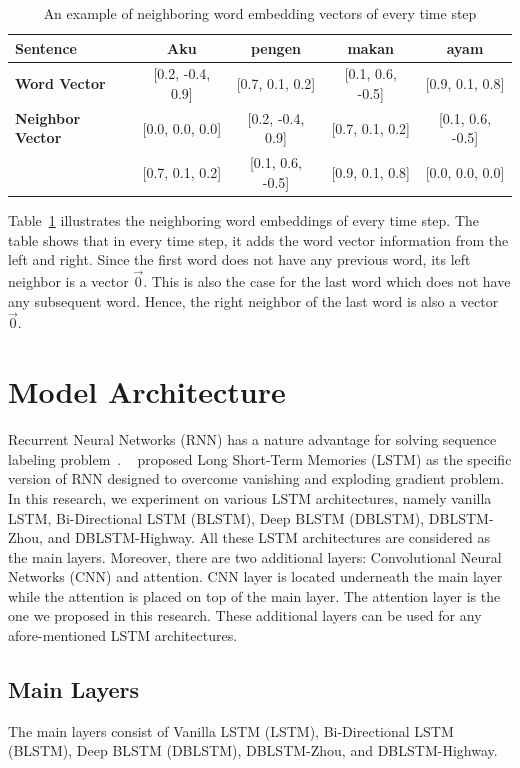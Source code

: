 \begin{table}
	\centering
	\caption{An example of neighboring word embedding vectors of every time step}
	\label{tab:examplenwe}
	\begin{tabular}{|lcccc|}
		\hline
		\textbf{Sentence} 				& Aku & pengen & makan & ayam \\
		\hline
		\textbf{Word Vector}		& [0.2, -0.4, 0.9] & [0.7, 0.1, 0.2] & [0.1, 0.6, -0.5] & [0.9, 0.1, 0.8] \\			\textbf{Neighbor Vector}	& [0.0, 0.0, 0.0] & [0.2, -0.4, 0.9] & [0.7, 0.1, 0.2] & [0.1, 0.6, -0.5] \\
													& [0.7, 0.1, 0.2] & [0.1, 0.6, -0.5] &  [0.9, 0.1, 0.8] &  [0.0, 0.0, 0.0] \\
		\hline
	\end{tabular}
\end{table}

Table~\ref{tab:examplenwe} illustrates the neighboring word embeddings of every time step. The table shows that in every time step, it adds the word vector information from the left and right. Since the first word does not have any previous word, its left neighbor is a vector $\vec{0}$. This is also the case for the last word which does not have any subsequent word. Hence, the right neighbor of the last word is also a vector  $\vec{0}$.

\section{Model Architecture}
Recurrent Neural Networks (RNN) has a nature advantage for solving sequence labeling problem~\citep{zhou2015end}. ~\cite{hochreiter1997long} proposed Long Short-Term Memories (LSTM) as the specific version of RNN designed to overcome vanishing and exploding gradient problem. In this research, we experiment on various LSTM architectures, namely vanilla LSTM, Bi-Directional LSTM (BLSTM), Deep BLSTM (DBLSTM), DBLSTM-Zhou, and DBLSTM-Highway. All these LSTM architectures are considered as the main layers. Moreover, there are two additional layers: Convolutional Neural Networks (CNN) and attention. CNN layer is located underneath the main layer while the attention is placed on top of the main layer. The attention layer is the one we proposed in this research. These additional layers can be used for any afore-mentioned LSTM architectures.

\subsection{Main Layers}
The main layers consist of Vanilla LSTM (LSTM), Bi-Directional LSTM (BLSTM), Deep BLSTM (DBLSTM), DBLSTM-Zhou, and DBLSTM-Highway.

